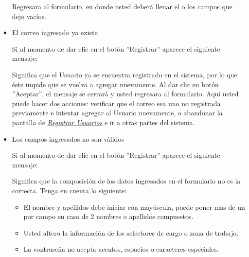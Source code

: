 \begin{itemize}
                         Regresara  al formulario, en donde usted deberá llenar el o los campos que dejo vacíos. 
                    
                    \item El correo ingresado ya existe
                
                        Si al momento de dar clic en el botón ''Registrar'' aparece el siguiente mensaje:
                        	
                    
                        Significa que el Usuario ya se encuentra registrado en el sistema, por lo que éste impide que se vuelva a agregar nuevamente. Al dar clic en botón ''Aceptar'', el mensaje se cerrará y usted regresara al formulario. Aqui usted puede hacer dos acciones: verificar que el correo sea uno no registrada previamente e intentar agregar al Usuario nuevamente, o abandonar la pantalla de \hyperlink{registrarUs}{\textit{Registrar Usuarios}} e ir a otras partes del sistema.
                    
                    \item Los campos ingresados no son válidos
                
                        Si al momento de dar clic en el botón ''Registrar'' aparece el siguiente mensaje:
                    
                        Significa que la composición de los datos ingresados en el formulario no es la correcta. Tenga en cuenta lo siguiente:
                    
                        \begin{itemize}
                            \item El nombre y apellidos debe iniciar con mayúscula, puede poner mas de un por campo en caso de 2 nombres o apellidos compuestos.
                            \item Usted altero la información de los selectores de cargo o zona de trabajo.
                            \item La contraseña no acepta acentos, espacios o caracteres especiales.
                        \end{itemize}
                    

\end{itemize}
